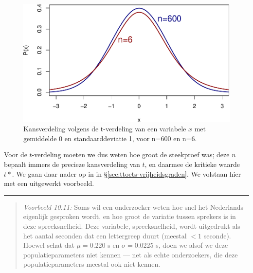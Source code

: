 \documentclass[
]{book}
\begin{document}
\begin{figure}
\centering
\includegraphics{KMS-NL_files/figure-latex/tkansverdeling-1.pdf}
\caption{\label{fig:tkansverdeling}Kansverdeling volgens de t-verdeling van een variabele \(x\) met gemiddelde 0 en standaarddeviatie 1, voor n=600 en n=6.}
\end{figure}

Voor de \(t\)-verdeling moeten we dus weten hoe groot de steekproef was;
deze \(n\) bepaalt immers de precieze kansverdeling van \(t\), en daarmee de
kritieke waarde \(t*\). We gaan daar nader op in in
§\ref{sec:ttoets-vrijheidsgraden}. We volstaan hier met een
uitgewerkt voorbeeld.

\begin{center}\rule{0.5\linewidth}{0.5pt}\end{center}

\begin{quote}
\emph{Voorbeeld 10.11:}
Soms wil een onderzoeker weten hoe snel het Nederlands eigenlijk
gesproken wordt, en hoe groot de variatie tussen sprekers is in deze
spreeksnelheid. Deze variabele, spreeksnelheid, wordt uitgedrukt als het
aantal seconden dat een lettergreep duurt (meestal \(<1\) seconde). Hoewel \citep{Quene08}
schat dat \(\mu=0.220\) s en \(\sigma=0.0225\) s, doen we alsof we deze
populatieparameters niet kennen --- net als echte onderzoekers, die deze
populatieparameters meestal ook niet kennen.
\end{quote}
\end{document}
